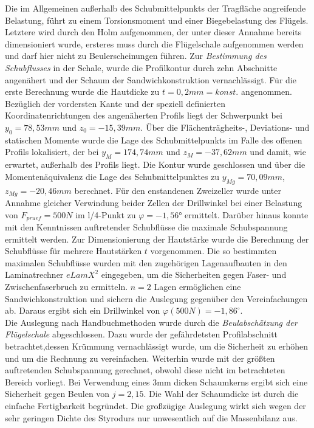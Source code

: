 \noindent Die im Allgemeinen außerhalb des Schubmittelpunkts der Tragfläche angreifende Belastung, führt zu einem Torsionsmoment und einer Biegebelastung des Flügels. Letztere wird durch den Holm aufgenommen, der unter dieser Annahme bereits dimensioniert wurde, ersteres muss durch die Flügelschale aufgenommen werden und darf hier nicht zu Beulerscheinungen führen. Zur \textit{Bestimmung des Schubflusses} in der Schale, wurde die Profilkontur durch zehn Abschnitte angenähert und der Schaum der Sandwichkonstruktion vernachlässigt. Für die erste Berechnung wurde die Hautdicke zu $ t=0,2mm=konst. $ angenommen. Bezüglich der vordersten Kante und der speziell definierten Koordinatenrichtungen des angenäherten Profils liegt der Schwerpunkt bei $ y_{0}=78,53mm $ und $ z_{0}=-15,39mm $. Über die Flächenträgheits-, Deviations- und statischen Momente wurde die Lage des Schubmittelpunkts im Falle des offenen Profils lokalisiert, der bei $ y_{M}=174,74mm $ und $ z_{M}=-37,62mm $ und damit, wie erwartet, außerhalb des Profils liegt. Die Kontur wurde geschlossen und über die Momentenäquivalenz die Lage des Schubmittelpunktes zu $ y_{Mg}=70,09mm $, $ z_{Mg}=-20,46mm $ berechnet. Für den enstandenen Zweizeller wurde unter Annahme gleicher Verwindung beider Zellen der Drillwinkel bei einer Belastung von $ F_{pruef}=500N $ im l/4-Punkt zu $ \varphi=-1,56° $ ermittelt. Darüber hinaus konnte mit den Kenntnissen auftretender Schubflüsse die maximale Schubspannung ermittelt werden. Zur Dimensionierung der Hautstärke wurde die Berechnung der Schubflüsse für mehrere Hautstärken $ t $ vorgenommen. Die so bestimmten maximalen Schubflüsse wurden mit den zugehörigen Lagenaufbauten in den Laminatrechner $ eLamX^{2} $ eingegeben, um die Sicherheiten gegen Faser- und Zwischenfaserbruch zu ermitteln. $ n=2 $ Lagen ermöglichen eine Sandwichkonstruktion und sichern die Auslegung gegenüber den Vereinfachungen ab. Daraus ergibt sich ein Drillwinkel von $ \varphi(500N)=-1,86^{\circ} $.\\

\noindent Die Auslegung nach Handbuchmethoden wurde durch die \textit{Beulabschätzung der Flügelschale} abgeschlossen. Dazu wurde der gefährdetsten Profilabschnitt betrachtet,dessen Krümmung vernachlässigt wurde, um die Sicherheit zu erhöhen und um die Rechnung zu vereinfachen. Weiterhin wurde mit der größten auftretenden Schubspannung gerechnet, obwohl diese nicht im betrachteten Bereich vorliegt. Bei Verwendung eines 3mm dicken Schaumkerns ergibt sich eine Sicherheit gegen Beulen von $ j=2,15 $. Die Wahl der Schaumdicke ist durch die einfache Fertigbarkeit begründet. Die großzügige Auslegung wirkt sich wegen der sehr geringen Dichte des Styrodurs nur unwesentlich auf die Massenbilanz aus. 


